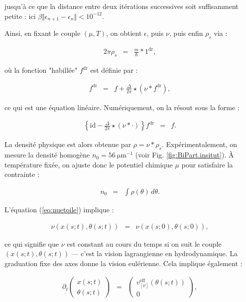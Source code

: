 jusqu'à ce que la distance entre deux itérations successives soit suffisamment petite : ici $\beta \Vert \epsilon_{n+1} - \epsilon_n \Vert < 10^{-12}$.

Ainsi, en fixant le couple $(\mu, T)$, on obtient $\epsilon$, puis $\nu$, puis enfin $\rho_s$ via :

\begin{eqnarray*}
	2\pi \rho_s & = & \frac{m}{\hbar} \ast 1^{\mathrm{dr}},
\end{eqnarray*}

où la fonction "habillée" $f^{\mathrm{dr}}$ est définie par :

\begin{eqnarray*}
	f^{\mathrm{dr}} & = & f + \frac{\Delta}{2\pi} \star ( \nu \ast f^{\mathrm{dr}} ),
\end{eqnarray*}

ce qui est une équation linéaire. Numériquement, on la résout sous la forme :

\begin{eqnarray*}
	\left\{ \mathrm{id} - \frac{\Delta}{2\pi} \star ( \nu \ast \cdot ) \right\} f^{\mathrm{dr}} & = & f.
\end{eqnarray*}

La densité physique est alors obtenue par $\rho = \nu \ast \rho_s$. Expérimentalement, on mesure la densité homogène $n_0 = 56~\mathrm{\mu m^{-1}}$ (voir Fig. \ref{fig:BiPart.insitut}). À température fixée, on ajuste donc le potentiel chimique $\mu$ pour satisfaire la contrainte :

\begin{eqnarray*}
	n_0 & = & \int \rho(\theta) \, d\theta.
\end{eqnarray*}

L'équation (\ref{eq:nuetoile}) implique :

\begin{eqnarray*}
	\nu(x(s;t), \theta(s;t)) & = & \nu(x(s;0), \theta(s;0)),
\end{eqnarray*}

ce qui signifie que $\nu$ est constant au cours du temps si on suit le couple $(x(s;t), \theta(s;t))$ — c’est la vision lagrangienne en hydrodynamique. La graduation fixe des axes donne la vision eulérienne. Cela implique également :

\begin{eqnarray*}
	\partial_t \left( \begin{array}{c} x(s;t) \\ \theta(s;t) \end{array} \right) & = & \left( \begin{array}{c} v^{\mathrm{eff}}_{[\nu]}(\theta(s;t)) \\ 0 \end{array} \right),
\end{eqnarray*}

